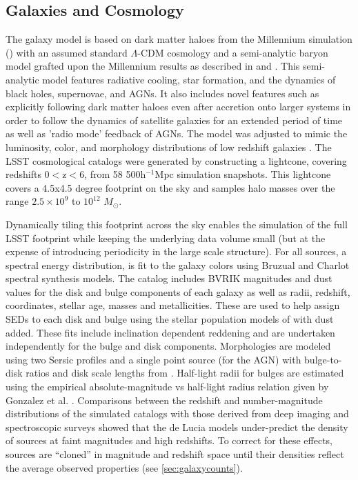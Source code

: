 \documentclass[]{article}
\begin{document}
\subsection{Galaxies and Cosmology \label{sec:gal}}

The galaxy model is based on dark matter haloes from the Millennium
simulation (\cite{springel05}) with an assumed standard $\Lambda$-CDM
cosmology and a semi-analytic baryon model grafted upon the Millennium
results as described in \cite{springel05} and \cite{delucia}. This
semi-analytic model features radiative cooling, star formation, and
the dynamics of black holes, supernovae, and AGNs. It also includes
novel features such as explicitly following dark matter haloes even
after accretion onto larger systems in order to follow the dynamics of
satellite galaxies for an extended period of time as well as 'radio
mode' feedback of AGNs. The model was adjusted to mimic the
luminosity, color, and morphology distributions of low redshift
galaxies \cite{delucia}. The LSST cosmological catalogs were generated
by constructing a lightcone, covering redshifts 0$<$z$<$6, from 58
500h$^{-1}$Mpc simulation snapshots. This lightcone covers a 4.5x4.5
degree footprint on the sky and samples halo masses over the range
$2.5\times10^9$ to $10^{12}$ $M_\odot$. 

Dynamically tiling this footprint across the sky enables the
simulation of the full LSST footprint while keeping the underlying
data volume small (but at the expense of introducing periodicity in
the large scale structure).  For all sources, a spectral energy
distribution, is fit to the galaxy colors using Bruzual and Charlot
spectral synthesis models\cite{bruzual}. The
\cite{delucia} catalog includes BVRIK magnitudes and dust values for
the disk and bulge components of each galaxy as well as radii,
redshift, coordinates, stellar age, masses and metallicities. These
are used to help assign SEDs to each disk and bulge using the stellar
population models of  with dust added. These fits include
inclination dependent reddening and are undertaken independently for
the bulge and disk components. Morphologies are modeled using two
Sersic profiles and a single point source (for the AGN) with
bulge-to-disk ratios and disk scale lengths from \cite{delucia}.
 Half-light radii for bulges are estimated using the empirical
absolute-magnitude vs half-light radius relation given by Gonzalez et
al. \cite{gonzalez09}.  Comparisons between the redshift and
number-magnitude distributions of the simulated catalogs with those
derived from deep imaging and spectroscopic surveys showed that the de
Lucia models under-predict the density of sources at faint magnitudes
and high redshifts. To correct for these effects, sources are
``cloned'' in magnitude and redshift space until their densities
reflect the average observed properties (see
\ref{sec:galaxycounts}). 
\end{document}
